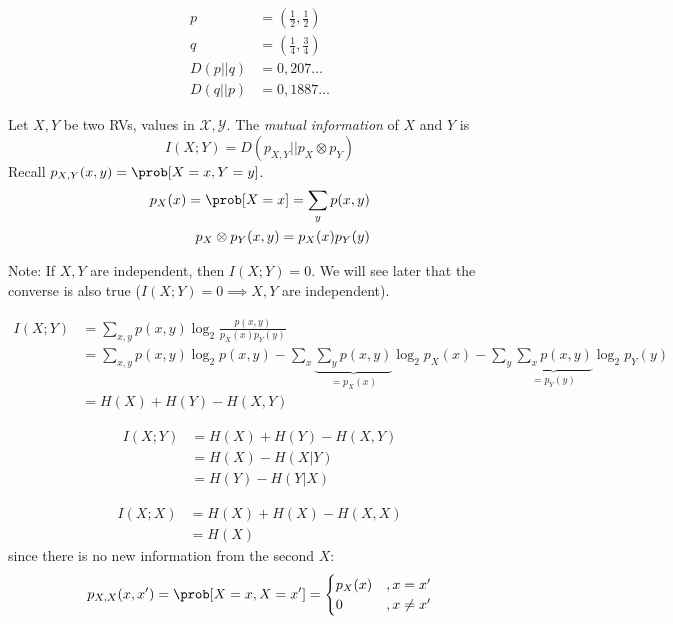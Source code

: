 \documentclass[mfit.tex]{subfiles}
\begin{document}
\begin{ex}
\begin{align*}
  p &= \left(\frac{1}{2},\frac{1}{2}\right) \\
  q &= \left(\frac{1}{4},\frac{3}{4}\right) \\
  D(p||q) &= 0,207\dots \\
  D(q||p) &= 0,1887\dots
\end{align*}
\end{ex}

\begin{defi*}
  Let $X,Y$ be two RVs, values in $\mathcal{X}, \mathcal{Y}$.
  The \emph{mutual information} of $X$ and $Y$ is 
  \[ I(X;Y) = D(p_{X,Y} || p_X \otimes p_Y) \]
  Recall $p_{X,Y}(x,y) = \prob[X=x,Y=y]$.
  \begin{align*}
    p_X(x) = \prob[X=x] = \sum_y p(x,y) \\
    p_X \otimes p_Y (x,y) = p_X(x) p_Y(y)
  \end{align*}
\end{defi*}

Note: If $X,Y$ are independent, then $I(X;Y) = 0$.
We will see later that the converse is also true ($I(X;Y) = 0 \implies X,Y$ are independent).

\begin{align*}
  I(X;Y) &= \sum_{x,y} p(x,y) \log_2 \frac{p(x,y)}{p_X(x) p_Y(y)} \\
  &= \sum_{x,y} p(x,y) \log_2 p(x,y) - \sum_x \underbrace{\sum_y p(x,y)}_{= p_X(x)} \log_2 p_X(x) - \sum_y \underbrace{\sum_x p(x,y)}_{= p_Y(y)} \log_2 p_Y(y) \\
  &= H(X) + H(Y) - H(X,Y)
 \end{align*}

\begin{lemma}
  \begin{align*}
    I(X;Y) &= H(X) + H(Y) - H(X,Y) \\
    &= H(X) - H(X|Y) \\
    &= H(Y) - H(Y|X)
  \end{align*}
\end{lemma}

\begin{align*}
  I(X;X) &= H(X) + H(X) - H(X,X) \\
  &= H(X)
\end{align*}
since there is no new information from the second $X$:
\[ p_{X,X} (x,x^\prime) = \prob[X=x,X=x^\prime] = \begin{cases} p_X(x) &, x = x^\prime \\ 0 &, x \neq x^\prime \end{cases} \]
\end{document}

